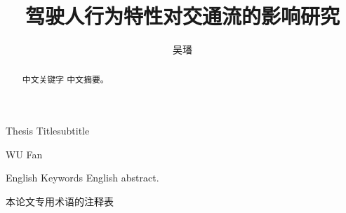 \documentclass[unicode,master,printedition]{seuthesis} %
\begin{document}
\title{驾驶人行为特性对交通流的影响研究}{}{Thesis Title}{subtitle}
\author{吴\quad{}璠}{WU Fan}
\address{河海院2楼}
\maketitle

\begin{abstract}{中文关键字}
  中文摘要。
\end{abstract}

\begin{englishabstract}{English Keywords}
  English abstract.
\end{englishabstract}

\begin{terminology}
  本论文专用术语的注释表
\end{terminology}

\begin{Main} %

%






\end{Main} %
\end{document}
